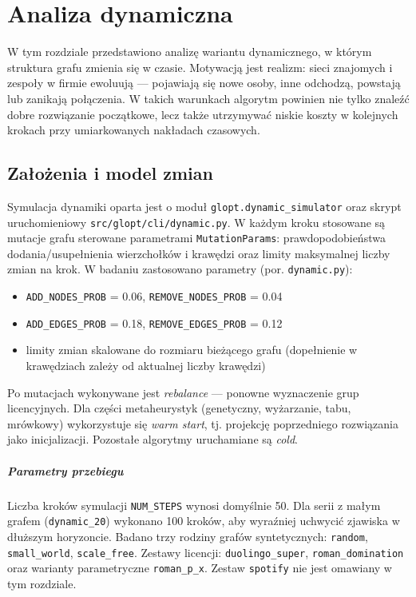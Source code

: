 \chapter{Analiza dynamiczna}\label{chap:dynamic}

W tym rozdziale przedstawiono analizę wariantu dynamicznego, w którym struktura grafu zmienia się w czasie. Motywacją jest realizm: sieci znajomych i zespoły w firmie ewoluują — pojawiają się nowe osoby, inne odchodzą, powstają lub zanikają połączenia. W takich warunkach algorytm powinien nie tylko znaleźć dobre rozwiązanie początkowe, lecz także utrzymywać niskie koszty w kolejnych krokach przy umiarkowanych nakładach czasowych.

\section{Założenia i model zmian}

Symulacja dynamiki oparta jest o moduł \texttt{glopt.dynamic\_simulator} oraz skrypt uruchomieniowy \texttt{src/glopt/cli/dynamic.py}. W każdym kroku stosowane są mutacje grafu sterowane parametrami \texttt{MutationParams}: prawdopodobieństwa dodania/usupełnienia wierzchołków i krawędzi oraz limity maksymalnej liczby zmian na krok. W badaniu zastosowano parametry (por. \texttt{dynamic.py}):
\begin{itemize}
  \item \texttt{ADD\_NODES\_PROB} = 0.06, \texttt{REMOVE\_NODES\_PROB} = 0.04
  \item \texttt{ADD\_EDGES\_PROB} = 0.18, \texttt{REMOVE\_EDGES\_PROB} = 0.12
  \item limity zmian skalowane do rozmiaru bieżącego grafu (dopełnienie w krawędziach zależy od aktualnej liczby krawędzi)
\end{itemize}
Po mutacjach wykonywane jest \emph{rebalance} — ponowne wyznaczenie grup licencyjnych. Dla części metaheurystyk (genetyczny, wyżarzanie, tabu, mrówkowy) wykorzystuje się \emph{warm start}, tj. projekcję poprzedniego rozwiązania jako inicjalizacji. Pozostałe algorytmy uruchamiane są \emph{cold}.

\paragraph{Parametry przebiegu} Liczba kroków symulacji \texttt{NUM\_STEPS} wynosi domyślnie 50. Dla serii z małym grafem (\texttt{dynamic\_20}) wykonano 100 kroków, aby wyraźniej uchwycić zjawiska w dłuższym horyzoncie. Badano trzy rodziny grafów syntetycznych: \texttt{random}, \texttt{small\_world}, \texttt{scale\_free}. Zestawy licencji: \texttt{duolingo\_super}, \texttt{roman\_domination} oraz warianty parametryczne \texttt{roman\_p\_x}. Zestaw \texttt{spotify} nie jest omawiany w tym rozdziale.


